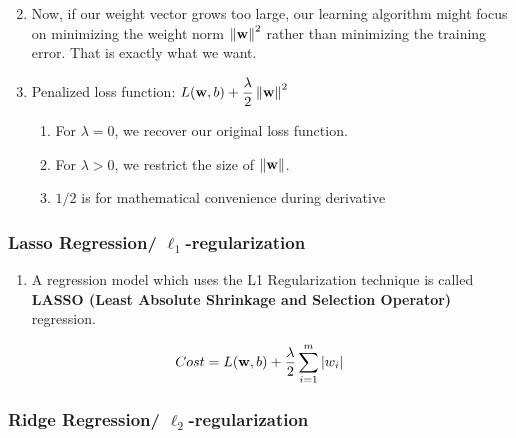 \begin{enumerate}[itemsep=0.2cm]
\begin{customTableWrapper}{2}
\begin{table}[H]
\begin{tabular}{l l}
            \end{tabular}
        \end{table}
    \end{customTableWrapper}

    \item Now, if our weight vector grows too large, our learning algorithm might focus on minimizing the weight norm $\left\| \mathbf{w} \right\|^2$ rather than minimizing the training error. That is exactly what we want.

    \item Penalized loss function: $L(\mathbf{w}, b) + \dfrac{\lambda}{2} \left\| \mathbf{w} \right\|^2$
    \begin{enumerate}
        \item For $\lambda = 0$, we recover our original loss function.

        \item For $\lambda > 0$, we restrict the size of $\left\| \mathbf{w} \right\|$.

        \item $1/2$ is for mathematical convenience during derivative

    \end{enumerate}

\end{enumerate}



\subsubsection{Lasso Regression/ $\ell_1$-regularization \cite{dnn-1,geeksforgeeks.org/regularization-in-machine-learning}} \label{l1 regularization/ Lasso Regression}

\begin{enumerate}
    \item A regression model which uses the L1 Regularization technique is called \textbf{LASSO (Least Absolute Shrinkage and Selection Operator)} regression.

\end{enumerate}


\[
    Cost = L(\mathbf{w}, b) + \dfrac{\lambda}{2} \displaystyle\sum_{i=1}^m \left| w_i \right|
\]


\subsubsection{Ridge Regression/ $\ell_2$-regularization \cite{dnn-1,geeksforgeeks.org/regularization-in-machine-learning}} \label{l1 regularization/ Ridge Regression}


